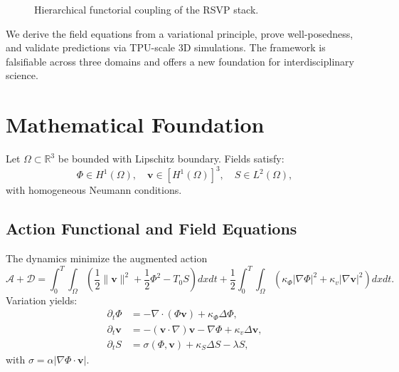 \documentclass[11pt,twoside]{article}
\theoremstyle{definition}
\theoremstyle{remark}
\begin{document}
\begin{figure}[ht]
\centering
{}
\caption{Hierarchical functorial coupling of the RSVP stack.}
\label{fig:stack}
\end{figure}

We derive the field equations from a variational principle, prove well-posedness, and validate predictions via TPU-scale 3D simulations. The framework is falsifiable across three domains and offers a new foundation for interdisciplinary science.

\section{Mathematical Foundation}
\label{sec:math}

Let $\Omega \subset \mathbb{R}^3$ be bounded with Lipschitz boundary. Fields satisfy:
\[
\Phi \in H^1(\Omega),\quad \mathbf{v} \in [H^1(\Omega)]^3,\quad S \in L^2(\Omega),
\]
with homogeneous Neumann conditions.

\subsection{Action Functional and Field Equations}

The dynamics minimize the augmented action
\begin{equation}
\boxed{\mathcal{A} + \mathcal{D} = \int_{0}^{T} \int_\Omega \left( \frac{1}{2}\|\mathbf{v}\|^2 + \frac{1}{2}\Phi^2 - T_0 S \right) dx dt + \frac{1}{2} \int_{0}^{T} \int_\Omega (\kappa_\Phi |\nabla \Phi|^2 + \kappa_v |\nabla \mathbf{v}|^2) dx dt.}
\label{eq:action}
\end{equation}
Variation yields:
\begin{align}
\partial_t \Phi &= -\nabla\cdot(\Phi \mathbf{v}) + \kappa_\Phi \Delta \Phi, \label{eq:phi} \\
\partial_t \mathbf{v} &= -(\mathbf{v}\cdot\nabla)\mathbf{v} - \nabla \Phi + \kappa_v \Delta \mathbf{v}, \label{eq:v} \\
\partial_t S &= \sigma(\Phi,\mathbf{v}) + \kappa_S \Delta S - \lambda S, \label{eq:S}
\end{align}
with $\sigma = \alpha |\nabla \Phi \cdot \mathbf{v}|$.
\end{document}
